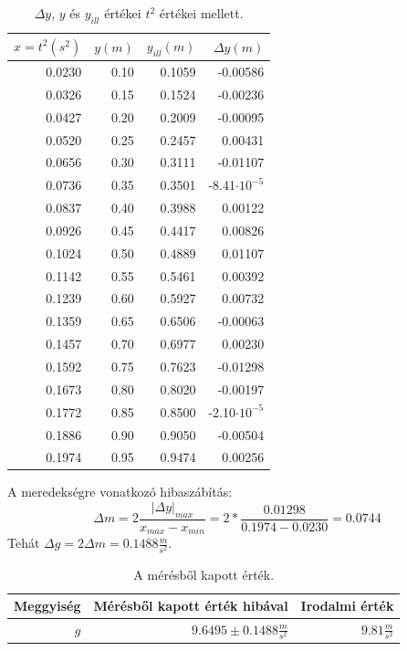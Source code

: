 \documentclass[10pt,pdftex]{report}
\begin{document}
\begin{table}[H]
    \centering
    \begin{tabular}{|r|r|r|r|}
        \hline
        $x=t^2(s^2)$ & $y(m)$ & $y_{ill}(m)$ & $\Delta y(m)$ \\
        \hline
        0.0230 & 0.10 & 0.1059 & -0.00586 \\
        \hline
        0.0326 & 0.15 & 0.1524 & -0.00236 \\
        \hline
        0.0427 & 0.20 & 0.2009 & -0.00095 \\
        \hline
        0.0520 & 0.25 & 0.2457 & 0.00431 \\
        \hline
        0.0656 & 0.30 & 0.3111 & -0.01107 \\
        \hline
        0.0736 & 0.35 & 0.3501 & -8.41$\cdot10^{-5}$ \\
        \hline
        0.0837 & 0.40 & 0.3988 & 0.00122 \\
        \hline
        0.0926 & 0.45 & 0.4417 & 0.00826 \\
        \hline
        0.1024 & 0.50 & 0.4889 & 0.01107 \\
        \hline
        0.1142 & 0.55 & 0.5461 & 0.00392 \\
        \hline
        0.1239 & 0.60 & 0.5927 & 0.00732 \\
        \hline
        0.1359 & 0.65 & 0.6506 & -0.00063 \\
        \hline
        0.1457 & 0.70 & 0.6977 & 0.00230 \\
        \hline
        0.1592 & 0.75 & 0.7623 & -0.01298 \\
        \hline
        0.1673 & 0.80 & 0.8020 & -0.00197 \\
        \hline
        0.1772 & 0.85 & 0.8500 & -2.10$\cdot10^{-5}$ \\
        \hline
        0.1886 & 0.90 & 0.9050 & -0.00504 \\
        \hline
        0.1974 & 0.95 & 0.9474 & 0.00256 \\
        \hline
    \end{tabular}
    \caption{$\Delta y$, $y$ és $y_{ill}$ értékei $t^2$ értékei mellett.}
\end{table}
A meredekségre vonatkozó hibaszábítás:
\begin{equation*}
    \Delta m = 2\frac{\left|\Delta y\right|_{max}}{x_{max}-x_{min}}=2*\frac{0.01298}{0.1974-0.0230}=0.0744
\end{equation*}
Tehát $\Delta g=2\Delta m=0.1488\frac{m}{s^2}$.
\begin{table}[H]
    \centering
    \begin{tabular}{|r|r|r|}
        \hline
        Meggyiség & Mérésből kapott érték hibával & Irodalmi érték \\
        \hline
        $g$ & $9.6495\pm0.1488\frac{m}{s^2}$ & $9.81\frac{m}{s^2}$ \\
        \hline
    \end{tabular}
    \caption{A mérésből kapott érték.}
\end{table}
\end{document}
